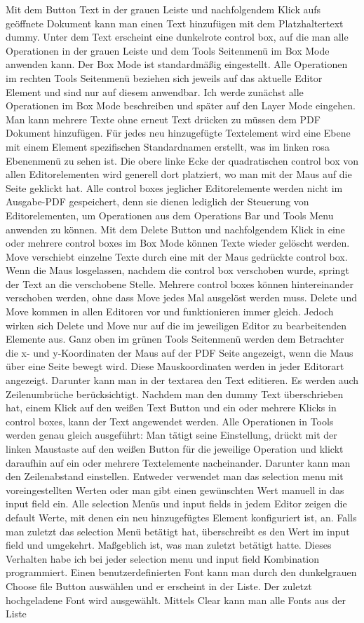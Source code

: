 Mit dem Button Text in der grauen Leiste und nachfolgendem Klick aufs geöffnete Dokument kann man einen Text hinzufügen mit dem Platzhaltertext dummy. Unter dem Text erscheint eine dunkelrote control box, auf die man alle Operationen in der grauen Leiste und dem Tools Seitenmenü im Box Mode anwenden kann. Der Box Mode ist standardmäßig eingestellt. Alle Operationen im rechten Tools Seitenmenü beziehen sich jeweils auf das aktuelle Editor Element und sind nur auf diesem anwendbar. Ich werde zunächst alle Operationen im Box Mode beschreiben und später auf den Layer Mode eingehen. Man kann mehrere Texte ohne erneut Text drücken zu müssen dem PDF Dokument hinzufügen. Für jedes neu hinzugefügte Textelement wird eine Ebene mit einem  Element spezifischen Standardnamen erstellt, was im linken rosa Ebenenmenü zu sehen ist. Die obere linke Ecke der quadratischen control box von allen Editorelementen wird generell dort platziert, wo man mit der Maus auf die Seite geklickt hat. Alle control boxes jeglicher Editorelemente werden nicht im Ausgabe-PDF gespeichert, denn sie dienen lediglich der Steuerung von Editorelementen, um Operationen aus dem Operations Bar und Tools Menu anwenden zu können. Mit dem Delete Button und nachfolgendem Klick in eine oder mehrere control boxes im Box Mode können Texte wieder gelöscht werden. Move verschiebt einzelne Texte durch eine mit der Maus gedrückte control box. Wenn die Maus losgelassen, nachdem die control box verschoben wurde, springt der Text an die verschobene Stelle. Mehrere control boxes können hintereinander verschoben werden, ohne dass Move jedes Mal ausgelöst werden muss. Delete und Move kommen in allen Editoren vor und funktionieren immer gleich. Jedoch wirken sich Delete und Move nur auf die im jeweiligen Editor zu bearbeitenden Elemente aus. Ganz oben im grünen Tools Seitenmenü werden dem Betrachter die x- und y-Koordinaten der Maus auf der PDF Seite angezeigt, wenn die Maus über eine Seite bewegt wird. Diese Mauskoordinaten werden in jeder Editorart angezeigt. Darunter kann man in der textarea den Text editieren. Es werden auch Zeilenumbrüche berücksichtigt. Nachdem man den dummy Text überschrieben hat, einem Klick auf den weißen Text Button und ein oder mehrere Klicks in control boxes, kann der Text angewendet werden. Alle Operationen in Tools werden genau gleich ausgeführt: Man tätigt seine Einstellung, drückt mit der linken Maustaste auf den weißen Button für die jeweilige Operation und klickt daraufhin auf ein oder mehrere Textelemente nacheinander. Darunter kann man den Zeilenabstand einstellen. Entweder verwendet man das selection menu mit voreingestellten Werten oder man gibt einen gewünschten Wert manuell in das input field ein. Alle selection Menüs und input fields in jedem Editor zeigen die default Werte, mit denen ein neu hinzugefügtes Element konfiguriert ist, an. Falls man zuletzt das selection Menü betätigt hat, überschreibt es den Wert im input field und umgekehrt. Maßgeblich ist, was man zuletzt betätigt hatte. Dieses Verhalten habe ich bei jeder selection menu und input field Kombination programmiert. Einen benutzerdefinierten Font kann man durch den dunkelgrauen Choose file Button auswählen und er erscheint in der Liste. Der zuletzt hochgeladene Font wird ausgewählt. Mittels Clear kann man alle Fonts aus der Liste 